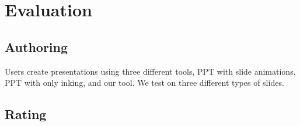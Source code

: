 \section{Evaluation}
\subsection{Authoring}
Users create presentations using three different tools, PPT with slide animations, PPT with only inking, and our tool. We test on three different types of slides. 

\subsection{Rating}

